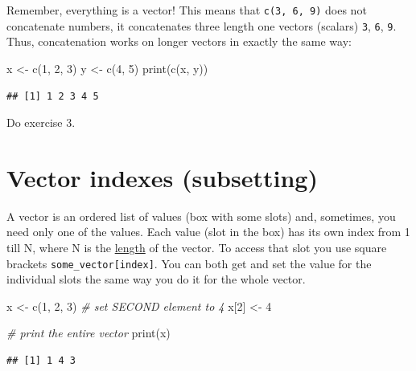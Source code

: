 \documentclass[
]{book}
\newenvironment{Shaded}{\begin{snugshade}}{\end{snugshade}}
\newcommand{\CommentTok}[1]{\textcolor[rgb]{0.56,0.35,0.01}{\textit{#1}}}
\newcommand{\DecValTok}[1]{\textcolor[rgb]{0.00,0.00,0.81}{#1}}
\newcommand{\FunctionTok}[1]{\textcolor[rgb]{0.00,0.00,0.00}{#1}}
\newcommand{\NormalTok}[1]{#1}
\newcommand{\OtherTok}[1]{\textcolor[rgb]{0.56,0.35,0.01}{#1}}
\begin{document}
Remember, everything is a vector! This means that \texttt{c(3,\ 6,\ 9)} does not concatenate numbers, it concatenates three length one vectors (scalars) \texttt{3}, \texttt{6}, \texttt{9}. Thus, concatenation works on longer vectors in exactly the same way:

\begin{Shaded}
\begin{Highlighting}[]
\NormalTok{x }\OtherTok{\textless{}{-}} \FunctionTok{c}\NormalTok{(}\DecValTok{1}\NormalTok{, }\DecValTok{2}\NormalTok{, }\DecValTok{3}\NormalTok{)}
\NormalTok{y }\OtherTok{\textless{}{-}} \FunctionTok{c}\NormalTok{(}\DecValTok{4}\NormalTok{, }\DecValTok{5}\NormalTok{)}
\FunctionTok{print}\NormalTok{(}\FunctionTok{c}\NormalTok{(x, y))}
\end{Highlighting}
\end{Shaded}

\begin{verbatim}
## [1] 1 2 3 4 5
\end{verbatim}

Do exercise 3.

\hypertarget{vector-index}{%
\section{Vector indexes (subsetting)}\label{vector-index}}

A vector is an ordered list of values (box with some slots) and, sometimes, you need only one of the values. Each value (slot in the box) has its own index from 1 till N, where N is the \href{https://stat.ethz.ch/R-manual/R-devel/library/base/html/length.html}{length} of the vector. To access that slot you use square brackets \texttt{some\_vector{[}index{]}}. You can both get and set the value for the individual slots the same way you do it for the whole vector.

\begin{Shaded}
\begin{Highlighting}[]
\NormalTok{x }\OtherTok{\textless{}{-}} \FunctionTok{c}\NormalTok{(}\DecValTok{1}\NormalTok{, }\DecValTok{2}\NormalTok{, }\DecValTok{3}\NormalTok{)}
\CommentTok{\# set SECOND element to 4}
\NormalTok{x[}\DecValTok{2}\NormalTok{] }\OtherTok{\textless{}{-}} \DecValTok{4}

\CommentTok{\# print the entire vector}
\FunctionTok{print}\NormalTok{(x)}
\end{Highlighting}
\end{Shaded}

\begin{verbatim}
## [1] 1 4 3
\end{verbatim}
\end{document}
